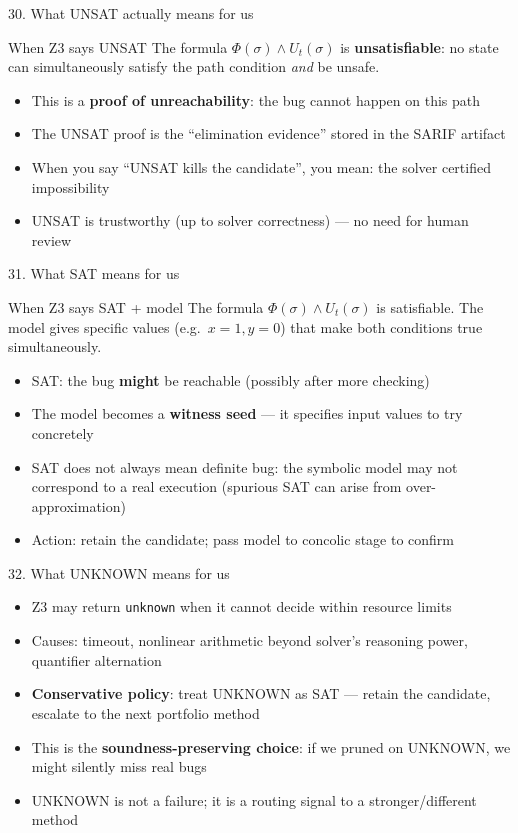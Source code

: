 \documentclass[aspectratio=169]{beamer}
\begin{document}
\begin{frame}{30. What UNSAT actually means for us}
\begin{block}{When Z3 says UNSAT}
The formula \(\Phi(\sigma) \wedge U_t(\sigma)\) is \textbf{unsatisfiable}: no state can simultaneously
satisfy the path condition \emph{and} be unsafe.
\end{block}
\begin{itemize}
  \item This is a \textbf{proof of unreachability}: the bug cannot happen on this path
  \item The UNSAT proof is the ``elimination evidence'' stored in the SARIF artifact
  \item When you say ``UNSAT kills the candidate'', you mean: the solver certified impossibility
  \item UNSAT is trustworthy (up to solver correctness) --- no need for human review
\end{itemize}
\end{frame}

\begin{frame}{31. What SAT means for us}
\begin{block}{When Z3 says SAT + model}
The formula \(\Phi(\sigma) \wedge U_t(\sigma)\) is satisfiable. The model gives specific values
(e.g.\ \(x=1, y=0\)) that make both conditions true simultaneously.
\end{block}
\begin{itemize}
  \item SAT: the bug \textbf{might} be reachable (possibly after more checking)
  \item The model becomes a \textbf{witness seed} --- it specifies input values to try concretely
  \item SAT does not always mean definite bug: the symbolic model may not correspond to a real execution (spurious SAT can arise from over-approximation)
  \item Action: retain the candidate; pass model to concolic stage to confirm
\end{itemize}
\end{frame}

\begin{frame}{32. What UNKNOWN means for us}
\begin{itemize}
  \item Z3 may return \texttt{unknown} when it cannot decide within resource limits
  \item Causes: timeout, nonlinear arithmetic beyond solver's reasoning power, quantifier alternation
  \item \textbf{Conservative policy}: treat UNKNOWN as SAT --- retain the candidate, escalate to the next portfolio method
  \item This is the \textbf{soundness-preserving choice}: if we pruned on UNKNOWN, we might silently miss real bugs
  \item UNKNOWN is not a failure; it is a routing signal to a stronger/different method
\end{itemize}
\end{frame}
\end{document}

